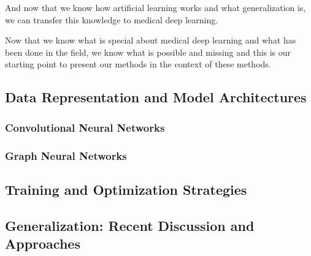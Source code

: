     And now that we know how artificial learning works and what generalization is, we can transfer this knowledge to medical deep learning.


    Now that we know what is special about medical deep learning and what has been done in the field, we know what is possible and missing and this is our starting point to present our methods in the context of these methods.

    \subsection{Data Representation and Model Architectures}

        \subsubsection{Convolutional Neural Networks}
        \subsubsection{Graph Neural Networks}


    \subsection{Training and Optimization Strategies}

    \subsection{Generalization: Recent Discussion and Approaches}
